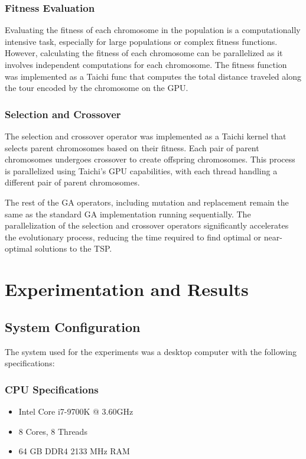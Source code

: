 \documentclass[conference]{IEEEtran}
\begin{document}
\subsubsection{Fitness Evaluation}
Evaluating the fitness of each chromosome in the population is a
computationally intensive task, especially for large populations or complex
fitness functions. However, calculating the fitness of each chromosome can be
parallelized as it involves independent computations for each chromosome. The
fitness function was implemented as a Taichi func that computes the total
distance traveled along the tour encoded by the chromosome on the GPU.

\subsubsection{Selection and Crossover}
The selection and crossover operator was implemented as a Taichi kernel that
selects parent chromosomes based on their fitness. Each pair of parent
chromosomes undergoes crossover to create offspring chromosomes. This process
is parallelized using Taichi's GPU capabilities, with each thread handling a
different pair of parent chromosomes.

The rest of the GA operators, including mutation and replacement remain the
same as the standard GA implementation running sequentially. The
parallelization of the selection and crossover operators significantly
accelerates the evolutionary process, reducing the time required to find
optimal or near-optimal solutions to the TSP.

\section{Experimentation and Results}
\subsection{System Configuration}
The system used for the experiments was a desktop computer with the following
specifications:

\subsubsection{CPU Specifications}
\begin{itemize}
    \item Intel Core i7-9700K @ 3.60GHz
    \item 8 Cores, 8 Threads
    \item 64 GB DDR4 2133 MHz RAM
\end{itemize}
\end{document}
